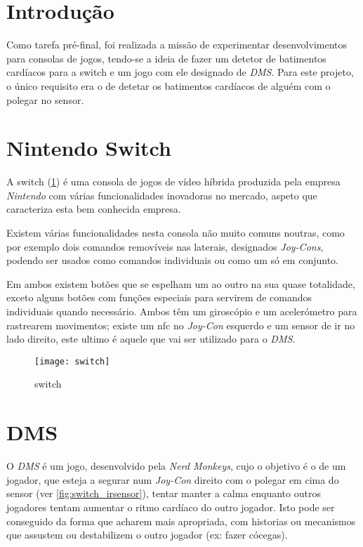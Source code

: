 \label{chap:bpm}

\section{Introdução}

Como tarefa pré-final, foi realizada a missão de experimentar desenvolvimentos para consolas de jogos, tendo-se a ideia de fazer um detetor de batimentos cardíacos
para a \gls{switch} e um jogo com ele designado de \textit{DMS}. Para este projeto, o único requisito era o de detetar os batimentos cardíacos de alguém com o polegar no sensor.

\section{Nintendo Switch}

A \gls{switch} (\cref{fig:switch}) é uma consola de jogos de vídeo híbrida produzida pela empresa \textit{Nintendo} com várias funcionalidades inovadoras no mercado, aspeto que caracteriza esta bem conhecida empresa.

Existem várias funcionalidades nesta consola não muito comuns noutras, como por exemplo dois comandos removíveis nas laterais, designados \textit{Joy-Cons}, podendo ser usados como comandos individuais ou como um só em conjunto.

Em ambos existem botões que se espelham um ao outro na sua quase totalidade, exceto alguns botões com funções especiais para servirem de comandos individuais quando necessário. Ambos têm um giroscópio e um acelerómetro para rastrearem movimentos; existe um \acrfull{nfc} no \textit{Joy-Con} esquerdo e um sensor de \acrshort{ir} no lado direito, este ultimo é aquele que vai ser utilizado para o \textit{DMS}.

\begin{figure}
  \centering
  \texttt{[image: switch]}
  \caption{\gls{switch} \cite{switch_info}}
  \label{fig:switch}
\end{figure}



\section{DMS}

O \textit{DMS} é um jogo, desenvolvido pela \textit{Nerd Monkeys}, cujo o objetivo é o de um jogador, que esteja a segurar num \textit{Joy-Con} direito com o polegar em cima do sensor (ver \cref{fig:switch_irsensor}), tentar manter a calma enquanto outros jogadores tentam aumentar o ritmo cardíaco do outro jogador. Isto pode ser conseguido da forma que acharem mais apropriada, com historias ou mecanismos que assustem ou destabilizem o outro jogador (ex: fazer cócegas).


